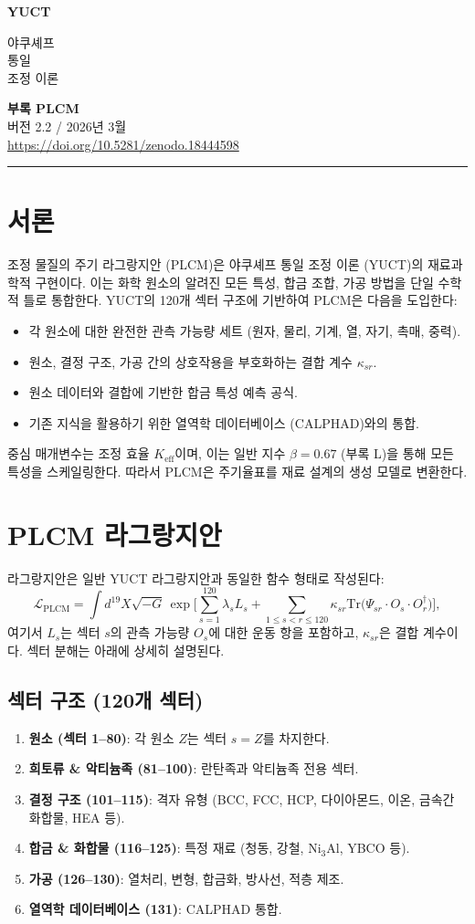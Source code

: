 \documentclass[12pt,a4paper]{article}
\newcommand{\Keff}{K_{\mathrm{eff}}}
\newcommand{\be}{\beta}           %
\newcommand{\makeheader}{%
	\noindent
	\begin{minipage}{0.17\textwidth}
		\raggedright
		{\sffamily\bfseries\color{skyblue}\fontsize{46}{46}\selectfont YUCT}%
	\end{minipage}%
	\hspace{30pt}
	\begin{minipage}{0.32\textwidth}
		\raggedright
		{\sffamily\fontsize{11}{13}\selectfont 야쿠셰프\\ 통일\\ 조정 이론}%
	\end{minipage}%
	\hfill
	\begin{minipage}{0.38\textwidth}
		\raggedleft
		{\sffamily\bfseries 부록 PLCM}\\ 
		{\sffamily 버전 2.2 / 2026년 3월}\\ 
		{\sffamily\footnotesize \url{https://doi.org/10.5281/zenodo.18444598}}%
	\end{minipage}
	\par\vspace{5pt}
	\noindent\textcolor{gold}{\rule{\textwidth}{1.6pt}}
	\par\vspace{0pt}
}
\begin{document}
	\makeheader
	\thispagestyle{firstpage}
	\vspace{15pt}
	
	\tableofcontents
	\newpage


	
	\section{서론}
	
	조정 물질의 주기 라그랑지안 (PLCM)은 야쿠셰프 통일 조정 이론 (YUCT)의 재료과학적 구현이다. 이는 화학 원소의 알려진 모든 특성, 합금 조합, 가공 방법을 단일 수학적 틀로 통합한다. YUCT의 120개 섹터 구조에 기반하여 PLCM은 다음을 도입한다:
	\begin{itemize}
		\item 각 원소에 대한 완전한 관측 가능량 세트 (원자, 물리, 기계, 열, 자기, 촉매, 중력).
		\item 원소, 결정 구조, 가공 간의 상호작용을 부호화하는 결합 계수 \(\kappa_{sr}\).
		\item 원소 데이터와 결합에 기반한 합금 특성 예측 공식.
		\item 기존 지식을 활용하기 위한 열역학 데이터베이스 (CALPHAD)와의 통합.
	\end{itemize}
	중심 매개변수는 조정 효율 \(\Keff\)이며, 이는 일반 지수 \(\be = 0.67\) (부록 L)을 통해 모든 특성을 스케일링한다. 따라서 PLCM은 주기율표를 재료 설계의 생성 모델로 변환한다.
	
	\section{PLCM 라그랑지안}
	
	라그랑지안은 일반 YUCT 라그랑지안과 동일한 함수 형태로 작성된다:
	\[
	\mathcal{L}_{\text{PLCM}} = \int d^{19}X \sqrt{-G} \,
	\exp\Bigg[ \sum_{s=1}^{120} \lambda_s L_s + \sum_{1\le s<r\le 120} \kappa_{sr} \mathrm{Tr}\big(\Psi_{sr} \cdot O_s \cdot O_r^\dagger\big) \Bigg],
	\]
	여기서 \(L_s\)는 섹터 \(s\)의 관측 가능량 \(O_s\)에 대한 운동 항을 포함하고, \(\kappa_{sr}\)은 결합 계수이다. 섹터 분해는 아래에 상세히 설명된다.
	
	\subsection{섹터 구조 (120개 섹터)}
	
	\begin{enumerate}
		\item \textbf{원소 (섹터 1–80)}: 각 원소 \(Z\)는 섹터 \(s=Z\)를 차지한다.
		\item \textbf{희토류 \& 악티늄족 (81–100)}: 란탄족과 악티늄족 전용 섹터.
		\item \textbf{결정 구조 (101–115)}: 격자 유형 (BCC, FCC, HCP, 다이아몬드, 이온, 금속간 화합물, HEA 등).
		\item \textbf{합금 \& 화합물 (116–125)}: 특정 재료 (청동, 강철, Ni\(_{3}\)Al, YBCO 등).
		\item \textbf{가공 (126–130)}: 열처리, 변형, 합금화, 방사선, 적층 제조.
		\item \textbf{열역학 데이터베이스 (131)}: CALPHAD 통합.
	\end{enumerate}
	
\end{document}
